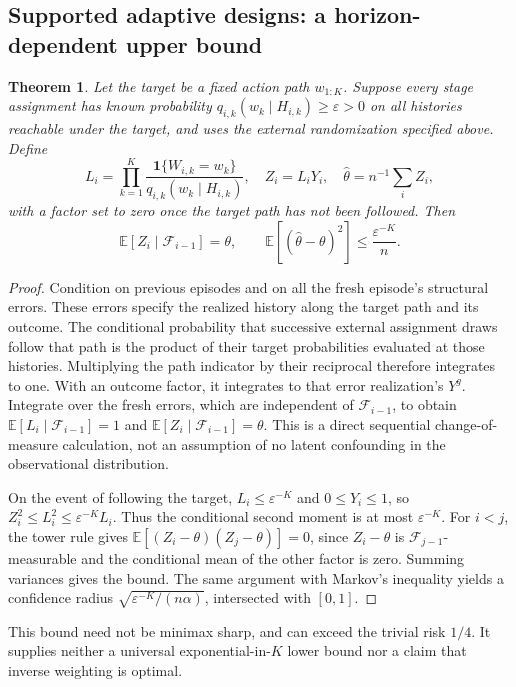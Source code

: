 \documentclass[11pt,a4paper]{article}
\newtheorem{theorem}{Theorem}[section]
\theoremstyle{remark}\newtheorem{remark}[theorem]{Remark}
\newcommand{\E}{\mathbb E}
\newcommand{\ind}{\mathbf 1}
\begin{document}
\subsection{Supported adaptive designs: a horizon-dependent upper bound}
\begin{theorem}\label{thm:ipw}
Let the target be a fixed action path $w_{1:K}$. Suppose every stage assignment has known probability $q_{i,k}(w_k\mid H_{i,k})\ge\varepsilon>0$ on all histories reachable under the target, and uses the external randomization specified above. Define
\[
L_i=\prod_{k=1}^K\frac{\ind\{W_{i,k}=w_k\}}{q_{i,k}(w_k\mid H_{i,k})},
\quad Z_i=L_iY_i,\quad\widehat\theta=n^{-1}\sum_i Z_i,
\]
with a factor set to zero once the target path has not been followed. Then
\[
\E[Z_i\mid\mathcal F_{i-1}]=\theta,\qquad
\E[(\widehat\theta-\theta)^2]\le\frac{\varepsilon^{-K}}n.
\]
\end{theorem}
\begin{proof}
Condition on previous episodes and on all the fresh episode's structural errors. These errors specify the realized history along the target path and its outcome. The conditional probability that successive external assignment draws follow that path is the product of their target probabilities evaluated at those histories. Multiplying the path indicator by their reciprocal therefore integrates to one. With an outcome factor, it integrates to that error realization's $Y^g$. Integrate over the fresh errors, which are independent of $\mathcal F_{i-1}$, to obtain $\E[L_i\mid\mathcal F_{i-1}]=1$ and $\E[Z_i\mid\mathcal F_{i-1}]=\theta$. This is a direct sequential change-of-measure calculation, not an assumption of no latent confounding in the observational distribution.

On the event of following the target, $L_i\le\varepsilon^{-K}$ and $0\le Y_i\le1$, so $Z_i^2\le L_i^2\le\varepsilon^{-K}L_i$. Thus the conditional second moment is at most $\varepsilon^{-K}$. For $i<j$, the tower rule gives
$\E[(Z_i-\theta)(Z_j-\theta)]=0$, since $Z_i-\theta$ is $\mathcal F_{j-1}$-measurable and the conditional mean of the other factor is zero. Summing variances gives the bound. The same argument with Markov's inequality yields a confidence radius $\sqrt{\varepsilon^{-K}/(n\alpha)}$, intersected with $[0,1]$.
\end{proof}
This bound need not be minimax sharp, and can exceed the trivial risk $1/4$. It supplies neither a universal exponential-in-$K$ lower bound nor a claim that inverse weighting is optimal.
\end{document}
